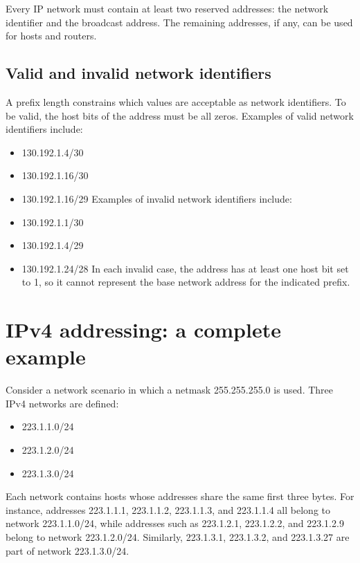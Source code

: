 Every IP network must contain at least two reserved addresses: the network identifier and the broadcast address. The remaining addresses, if any, can be used for hosts and routers.

\subsection{Valid and invalid network identifiers}

A prefix length constrains which values are acceptable as network identifiers. To be valid, the host bits of the address must be all zeros. Examples of valid network identifiers include:

\begin{itemize}
\item 130.192.1.4/30
\item 130.192.1.16/30
\item 130.192.1.16/29 Examples of invalid network identifiers include:
\item 130.192.1.1/30
\item 130.192.1.4/29
\item 130.192.1.24/28 In each invalid case, the address has at least one host bit set to 1, so it cannot represent the base network address for the indicated prefix.
\end{itemize}

\section{IPv4 addressing: a complete example}

Consider a network scenario in which a netmask 255.255.255.0 is used. Three IPv4 networks are defined:

\begin{itemize}
\item 223.1.1.0/24
\item 223.1.2.0/24
\item 223.1.3.0/24
\end{itemize}

Each network contains hosts whose addresses share the same first three bytes. For instance, addresses 223.1.1.1, 223.1.1.2, 223.1.1.3, and 223.1.1.4 all belong to network 223.1.1.0/24, while addresses such as 223.1.2.1, 223.1.2.2, and 223.1.2.9 belong to network 223.1.2.0/24. Similarly, 223.1.3.1, 223.1.3.2, and 223.1.3.27 are part of network 223.1.3.0/24.

\begin{center}
\end{center}

